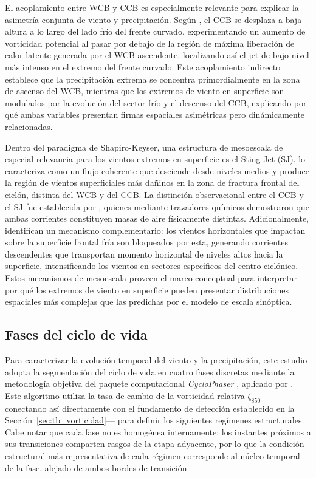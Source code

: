 El acoplamiento entre WCB y CCB es especialmente relevante para explicar la asimetría conjunta de viento y precipitación. Según \citet{schemm2014linkage}, el CCB se desplaza a baja altura a lo largo del lado frío del frente curvado, experimentando un aumento de vorticidad potencial al pasar por debajo de la región de máxima liberación de calor latente generada por el WCB ascendente, localizando así el jet de bajo nivel más intenso en el extremo del frente curvado. Este acoplamiento indirecto establece que la precipitación extrema se concentra primordialmente en la zona de ascenso del WCB, mientras que los extremos de viento en superficie son modulados por la evolución del sector frío y el descenso del CCB, explicando por qué ambas variables presentan firmas espaciales asimétricas pero dinámicamente relacionadas.

Dentro del paradigma de Shapiro-Keyser, una estructura de mesoescala de especial relevancia para los vientos extremos en superficie es el Sting Jet (SJ). \citet{clark2005sting} lo caracteriza como un flujo coherente que desciende desde niveles medios y produce la región de vientos superficiales más dañinos en la zona de fractura frontal del ciclón, distinta del WCB y del CCB. La distinción observacional entre el CCB y el SJ fue establecida por \citet{martinez2014cold}, quienes mediante trazadores químicos demostraron que ambas corrientes constituyen masas de aire físicamente distintas. Adicionalmente, \citet{hyeok2024extrem} identifican un mecanismo complementario: los vientos horizontales que impactan sobre la superficie frontal fría son bloqueados por esta, generando corrientes descendentes que transportan momento horizontal de niveles altos hacia la superficie, intensificando los vientos en sectores específicos del centro ciclónico. Estos mecanismos de mesoescala proveen el marco conceptual para interpretar por qué los extremos de viento en superficie pueden presentar distribuciones espaciales más complejas que las predichas por el modelo de escala sinóptica.

\subsection{Fases del ciclo de vida}\label{subsec:tb_fases}

Para caracterizar la evolución temporal del viento y la precipitación, este estudio adopta la segmentación del ciclo de vida en cuatro fases discretas mediante la metodología objetiva del paquete computacional \textit{CycloPhaser} \citep{deSouza2025CycloPhaser}, aplicado por \citet{coutodesouza2024new}. Este algoritmo utiliza la tasa de cambio de la vorticidad relativa $\zeta_{850}$ —conectando así directamente con el fundamento de detección establecido en la Sección~\ref{sec:tb_vorticidad}— para definir los siguientes regímenes estructurales. Cabe notar que cada fase no es homogénea internamente: los instantes próximos a sus transiciones comparten rasgos de la etapa adyacente, por lo que la condición estructural más representativa de cada régimen corresponde al núcleo temporal de la fase, alejado de ambos bordes de transición.

